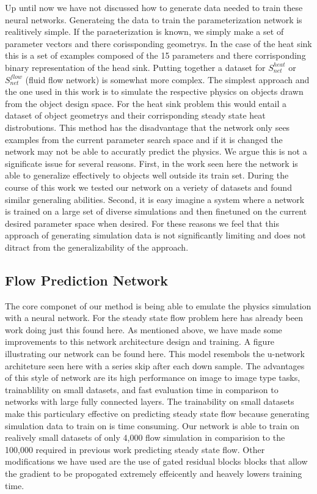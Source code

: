\documentclass{article} %
\begin{document}
Up until now we have not discussed how to generate data needed to train these neural networks. Generateing the data to train the parameterization network is realitively simple. If the paraeterization is known, we simply make a set of parameter vectors and there corissponding geometrys. In the case of the heat sink this is a set of examples composed of the 15 parameters and there corrisponding binary representation of the head sink. Putting together a dataset for $S^{heat}_{net}$ or $S^{flow}_{net}$ (fluid flow network) is somewhat more complex. The simplest approach and the one used in this work is to simulate the respective physics on objects drawn from the object design space. For the heat sink problem this would entail a dataset of object geometrys and their corrisponding steady state heat distrobutions. This method has the disadvantage that the network only sees examples from the current parameter search space and if it is changed the network may not be able to accuratly predict the physics. We argue this is not a significate issue for several reasons. First, in the work seen here the network is able to generalize effectively to objects well outside its train set. During the course of this work we tested our network on a veriety of datasets and found similar generaling abilities. Second, it is easy imagine a system where a network is trained on a large set of diverse simulations and then finetuned on the current desired parameter space when desired. For these reasons we feel that this approach of generating simulation data is not significantly limiting and does not ditract from the generalizability of the approach.

\subsection{Flow Prediction Network}

The core componet of our method is being able to emulate the physics simulation with a neural network. For the steady state flow problem here has already been work doing just this found here. As mentioned above, we have made some improvements to this network architecture design and training. A figure illustrating our network can be found here. This model resembols the u-network architeture seen here with a series skip after each down sample. The advantages of this style of network are its high performance on image to image type tasks, trainablility on small datasets, and fast evaluation time in comparison to networks with large fully connected layers. The trainability on small datasets make this particulary effective on predicting steady state flow because generating simulation data to train on is time consuming. Our network is able to train on realively small datasets of only 4,000 flow simulation in comparision to the 100,000 required in previous work predicting steady state flow. Other modifications we have used are the use of gated residual blocks blocks that allow the gradient to be propogated extremely effeicently and heavely lowers training time.
\end{document}
